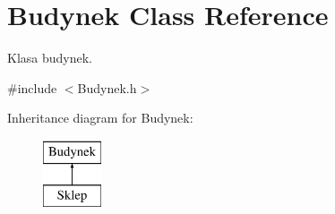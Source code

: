\hypertarget{class_budynek}{}\section{Budynek Class Reference}
\label{class_budynek}


Klasa budynek.  




{\ttfamily \#include $<$Budynek.\+h$>$}

Inheritance diagram for Budynek\+:\begin{figure}[H]
\begin{center}
\leavevmode
\includegraphics[height=2.000000cm]{class_budynek}
\end{center}
\end{figure}
